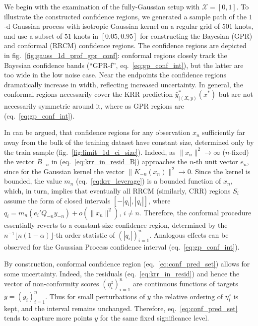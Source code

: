 \documentclass[conference]{IEEEtran}
\newcommand{\Xcal}{\mathcal{X}}
\newcommand{\Real}{\mathbb{R}}
\begin{document}
We begin with the examination of the fully-Gaussian setup with $\Xcal=[0, 1]$.
To illustrate the constructed confidence regions, we generated a sample path of
the $1$-d Gaussian process with isotropic Gaussian kernel on a regular grid of
$501$ knots, and use a subset of $51$ knots in $[0.05, 0.95]$ for constructing
the Bayesian (GPR) and conformal (RRCM) confidence regions. The confidence regions
are depicted in fig.~\ref{fig:gauss_1d_prof_gpr_conf}: conformal regions closely
track the Bayesian confidence bands (``GPR-f'', eq.~\ref{eq:gp_conf_int}), but the
latter are too wide in the low noise case. Near the endpoints the confidence regions
dramatically increase in width, reflecting increased uncertainty. In general, the
conformal regions necessarily cover the KRR prediction $\hat{y}^*_{|(X, y)}(x^*)$
but are not necessarily symmetric around it, where as GPR regions are (eq.~\ref{eq:gp_conf_int}).

In can be argued, that confidence regions for any observation $x_n$ sufficiently
far away from the bulk of the training dataset have constant size, determined only
by the train sample (fig.~\ref{fig:limit_1d_ci_size}). Indeed, as $\|x_n\|^2\to \infty$
($n$-fixed) the vector $B_{-n}$ in (eq.~\ref{eq:krr_in_resid_B}) approaches the
$n$-th unit vector $e_n$, since for the Gaussian kernel the vector $\|K_{-n}(x_n)\|^2\to 0$.
Since the kernel is bounded, the value $m_n$ (eq.~\ref{eq:krr_leverage}) is a bounded
function of $x_n$, which, in turn, implies that eventually all RRCM (similarly, CRR)
regions $S_i$ assume the form of closed intervals $[-|q_i|, |q_i|]$, where
$q_i = m_n (e_i'Q_{-n}y_{-n}) + o(\|x_n\|^2)$, $i \neq n$. Therefore, the conformal
procedure essentially reverts to a constant-size confidence region, determined by
the $n^{-1}\lfloor n(1-\alpha)\rfloor$-th order statistic of $(|q_i|)_{i=1}^n$.
Analogous effects can be observed for the Gaussian Process confidence interval
(eq.~\ref{eq:gp_conf_int}).

By construction, conformal confidence region (eq.~\ref{eq:conf_pred_set}) allows
for some uncertainty. Indeed, the residuals (eq.~\ref{eq:krr_in_resid}) and hence
the vector of non-conformity scores $(\eta^z_i)_{i=1}^n$ are continuous functions
of targets $y=(y_i)_{i=1}^n$. Thus for small perturbations of $y$ the relative
ordering of $\eta^z_i$ is kept, and the interval remains unchanged. Therefore,
eq.~\ref{eq:conf_pred_set} tends to capture more points $y$ for the same fixed
significance level.
\end{document}
